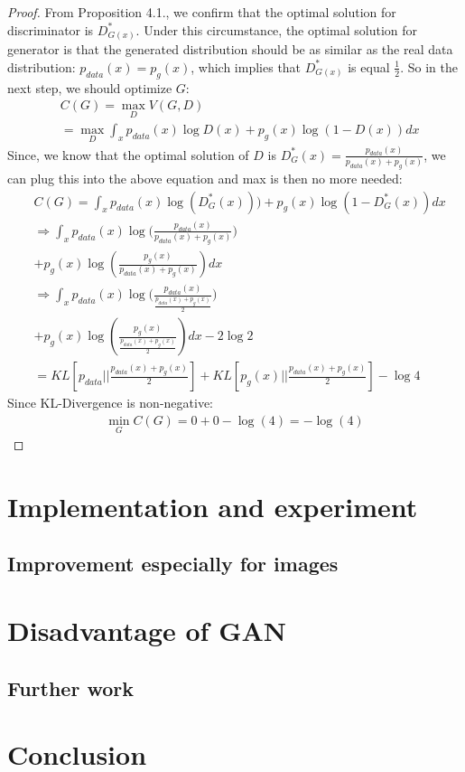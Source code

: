 \documentclass[10pt,twocolumn,letterpaper]{article}
\begin{document}
\begin{proof}
From Proposition 4.1., we confirm that the optimal solution for discriminator is $D_{G(x)}^*$. Under this circumstance, the optimal solution for generator is that the generated distribution should be as similar as the real data distribution: $p_{data}(x)=p_g(x)$, which implies that  $D_{G(x)}^*$ is equal $\frac{1}{2}$. So in the next step, we should optimize $G$:
\begin{align*}
    &C(G)=\max_DV(G, D)\\
    &=\max_D\int_xp_{data}(x)\log{D(x)} + p_g(x)\log{(1-D(x))}dx
\end{align*}
Since, we know that the optimal solution of $D$ is $ D_G^*(x) = \frac{p_{data}(x)}{p_{data}(x) + p_g(x)}$, we can plug this into the above equation and max is then no more needed:
\begin{align*}
    &C(G)=\int_xp_{data}(x)\log{(D_G^*(x))})+p_g(x)\log{(1-D_G^*(x))}dx    \\
    &\Longrightarrow\int_xp_{data}(x)\log{(\frac{p_{data}(x)}{p_{data}(x)+p_g(x)}})\\
    &+p_g(x)\log{(\frac{p_{g}(x)}{p_{data}(x)+p_g(x)})}dx\\
    &\Longrightarrow\int_xp_{data}(x)\log{(\frac{p_{data}(x)}{\frac{p_{data}(x)+p_g(x)}{2}}})\\
    &+p_g(x)\log{(\frac{p_{g}(x)}{\frac{p_{data}(x)+p_g(x)}{2}})}dx-2\log{2}\\
    &=KL[p_{data}||\frac{p_{data}(x)+p_g(x)}{2}] + KL[p_g(x)||\frac{p_{data}(x)+p_g(x)}{2}]-\log{4}
\end{align*}
Since KL-Divergence is non-negative:
\begin{align*}
    \min_GC(G) = 0 + 0 - \log(4) = -\log(4)
\end{align*}
\end{proof}

\section{Implementation and experiment}

\subsection{Improvement especially for images}

\section{Disadvantage of GAN}

\subsection{Further work}

\section{Conclusion}

{\small


}
\end{document}
